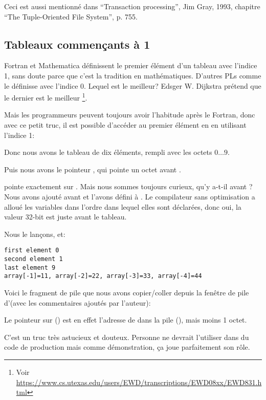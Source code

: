 Ceci est aussi mentionné dans ``Transaction processing'', Jim Gray, 1993,
chapitre ``The Tuple-Oriented File System'', p. 755.

\subsection{Tableaux commençants à 1}
\label{arrays_at_one}

Fortran et Mathematica définissent le premier élément d'un tableau avec l'indice 1,
sans doute parce que c'est la tradition en mathématiques.
D'autres \ac{PL}s comme \CCpp le définisse avec l'indice 0.
Lequel est le meilleur?
Edsger W. Dijkstra prétend que le dernier est le meilleur
\footnote{Voir \url{https://www.cs.utexas.edu/users/EWD/transcriptions/EWD08xx/EWD831.html}}.

Mais les programmeurs peuvent toujours avoir l'habitude après le Fortran, donc avec
ce petit truc, il est possible d'accéder au premier élément en \CCpp en utilisant l'indice 1:





Donc nous avons le tableau  de dix éléments, rempli avec les octets $0 \ldots 9$.

Puis nous avons le pointeur , qui pointe un octet avant .

 pointe exactement sur .
Mais nous sommes toujours curieux, qu'y a-t-il avant ?
Nous avons ajouté  avant  et l'avons défini à .
Le compilateur sans optimisation a alloué les variables dans l'ordre dans lequel
elles sont déclarées, donc oui, la valeur 32-bit  est juste avant
le tableau.

Nous le lançons, et:

\begin{lstlisting}
first element 0
second element 1
last element 9
array[-1]=11, array[-2]=22, array[-3]=33, array[-4]=44
\end{lstlisting}

Voici le fragment de pile que nous avons copier/coller depuis la fenêtre de pile
d'\olly (avec les commentaires ajoutés par l'auteur):



Le pointeur sur  () est en effet l'adresse de 
dans la pile (), mais moins 1 octet.

C'est un truc très astucieux et douteux. Personne ne devrait l'utiliser dans du code
de production mais comme démonstration, ça joue parfaitement son rôle.
